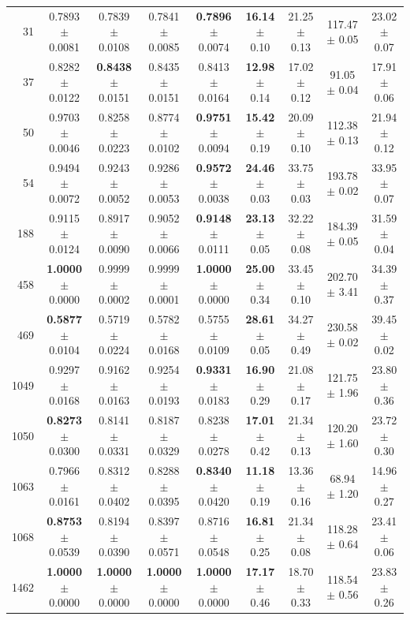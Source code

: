 \begin{table}[t]
\begin{tabular}{@{}rcccc@{\hspace{5pt}}cccc@{}}
31 & 0.7893 $\pm$ 0.0081 & 0.7839 $\pm$ 0.0108 & 0.7841 $\pm$ 0.0085 & \textbf{0.7896} $\pm$ 0.0074 & \textbf{16.14} $\pm$ 0.10 & 21.25 $\pm$ 0.13 & 117.47 $\pm$ 0.05 & 23.02 $\pm$ 0.07 \\
37 & 0.8282 $\pm$ 0.0122 & \textbf{0.8438} $\pm$ 0.0151 & 0.8435 $\pm$ 0.0151 & 0.8413 $\pm$ 0.0164 & \textbf{12.98} $\pm$ 0.14 & 17.02 $\pm$ 0.12 & 91.05 $\pm$ 0.04 & 17.91 $\pm$ 0.06 \\
50 & 0.9703 $\pm$ 0.0046 & 0.8258 $\pm$ 0.0223 & 0.8774 $\pm$ 0.0102 & \textbf{0.9751} $\pm$ 0.0094 & \textbf{15.42} $\pm$ 0.19 & 20.09 $\pm$ 0.10 & 112.38 $\pm$ 0.13 & 21.94 $\pm$ 0.12 \\
54 & 0.9494 $\pm$ 0.0072 & 0.9243 $\pm$ 0.0052 & 0.9286 $\pm$ 0.0053 & \textbf{0.9572} $\pm$ 0.0038 & \textbf{24.46} $\pm$ 0.03 & 33.75 $\pm$ 0.03 & 193.78 $\pm$ 0.02 & 33.95 $\pm$ 0.07 \\
188 & 0.9115 $\pm$ 0.0124 & 0.8917 $\pm$ 0.0090 & 0.9052 $\pm$ 0.0066 & \textbf{0.9148} $\pm$ 0.0111 & \textbf{23.13} $\pm$ 0.05 & 32.22 $\pm$ 0.08 & 184.39 $\pm$ 0.05 & 31.59 $\pm$ 0.04 \\
458 & \textbf{1.0000} $\pm$ 0.0000 & 0.9999 $\pm$ 0.0002 & 0.9999 $\pm$ 0.0001 & \textbf{1.0000} $\pm$ 0.0000 & \textbf{25.00} $\pm$ 0.34 & 33.45 $\pm$ 0.10 & 202.70 $\pm$ 3.41 & 34.39 $\pm$ 0.37 \\
469 & \textbf{0.5877} $\pm$ 0.0104 & 0.5719 $\pm$ 0.0224 & 0.5782 $\pm$ 0.0168 & 0.5755 $\pm$ 0.0109 & \textbf{28.61} $\pm$ 0.05 & 34.27 $\pm$ 0.49 & 230.58 $\pm$ 0.02 & 39.45 $\pm$ 0.02 \\
1049 & 0.9297 $\pm$ 0.0168 & 0.9162 $\pm$ 0.0163 & 0.9254 $\pm$ 0.0193 & \textbf{0.9331} $\pm$ 0.0183 & \textbf{16.90} $\pm$ 0.29 & 21.08 $\pm$ 0.17 & 121.75 $\pm$ 1.96 & 23.80 $\pm$ 0.36 \\
1050 & \textbf{0.8273} $\pm$ 0.0300 & 0.8141 $\pm$ 0.0331 & 0.8187 $\pm$ 0.0329 & 0.8238 $\pm$ 0.0278 & \textbf{17.01} $\pm$ 0.42 & 21.34 $\pm$ 0.13 & 120.20 $\pm$ 1.60 & 23.72 $\pm$ 0.30 \\
1063 & 0.7966 $\pm$ 0.0161 & 0.8312 $\pm$ 0.0402 & 0.8288 $\pm$ 0.0395 & \textbf{0.8340} $\pm$ 0.0420 & \textbf{11.18} $\pm$ 0.19 & 13.36 $\pm$ 0.16 & 68.94 $\pm$ 1.20 & 14.96 $\pm$ 0.27 \\
1068 & \textbf{0.8753} $\pm$ 0.0539 & 0.8194 $\pm$ 0.0390 & 0.8397 $\pm$ 0.0571 & 0.8716 $\pm$ 0.0548 & \textbf{16.81} $\pm$ 0.25 & 21.34 $\pm$ 0.08 & 118.28 $\pm$ 0.64 & 23.41 $\pm$ 0.06 \\
1462 & \textbf{1.0000} $\pm$ 0.0000 & \textbf{1.0000} $\pm$ 0.0000 & \textbf{1.0000} $\pm$ 0.0000 & \textbf{1.0000} $\pm$ 0.0000 & \textbf{17.17} $\pm$ 0.46 & 18.70 $\pm$ 0.33 & 118.54 $\pm$ 0.56 & 23.83 $\pm$ 0.26 \\

\end{tabular}
\end{table}
